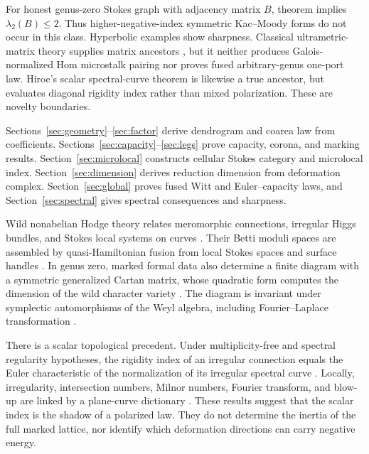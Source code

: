 \documentclass[11pt,a4paper]{amsart}
\theoremstyle{plain}
\theoremstyle{definition}
\begin{document}
For honest genus-zero Stokes graph with adjacency matrix $B$, theorem implies
$\lambda_2(B)\le2$.  Thus higher-negative-index symmetric Kac--Moody forms do not occur in this
class.  Hyperbolic examples show sharpness.  Classical ultrametric-matrix theory supplies matrix
ancestors \cite{MartinezMichonSanMartin1994,McDonaldEtAl1995,NabbenVarga1995}, but it neither
produces Galois-normalized Hom microstalk pairing nor proves fused arbitrary-genus one-port law.
Hiroe's scalar spectral-curve theorem is likewise a true ancestor, but evaluates diagonal rigidity
index rather than mixed polarization.  These are novelty boundaries.

Sections~\ref{sec:geometry}--\ref{sec:factor} derive dendrogram and coarea law from coefficients.
Sections~\ref{sec:capacity}--\ref{sec:legs} prove capacity, corona, and marking results.
Section~\ref{sec:microlocal} constructs cellular Stokes category and microlocal index.
Section~\ref{sec:dimension} derives reduction dimension from deformation complex.
Section~\ref{sec:global} proves fused Witt and Euler--capacity laws, and
Section~\ref{sec:spectral} gives spectral consequences and sharpness.

\iffalse

Wild nonabelian Hodge theory relates meromorphic connections, irregular Higgs bundles, and Stokes
local systems on curves \cite{BiquardBoalch2004}.  Their Betti moduli spaces are assembled by
quasi-Hamiltonian fusion from local Stokes spaces and surface handles
\cite{Boalch2014Geometry,BoalchYamakawa2015Twisted}.  In genus zero, marked formal data also determine a finite diagram with
a symmetric generalized Cartan matrix, whose quadratic form computes the dimension of the wild
character variety \cite{BoalchYamakawa2020,Doucot2021Diagrams}.  The diagram is invariant under
symplectic automorphisms of the Weyl algebra, including Fourier--Laplace transformation
\cite{Doucot2021Diagrams}.

There is a scalar topological precedent.  Under multiplicity-free and spectral regularity
hypotheses, the rigidity index of an irregular connection equals the Euler characteristic of the
normalization of its irregular spectral curve \cite{Hiroe2019Rigidity}.  Locally, irregularity,
intersection numbers, Milnor numbers, Fourier transform, and blow-up are linked by a plane-curve
dictionary \cite{Hiroe2017Ramified}.  These results suggest that the scalar index is the shadow of
a polarized law.  They do not determine the inertia of the full marked lattice, nor identify which
deformation directions can carry negative energy.
\end{document}
